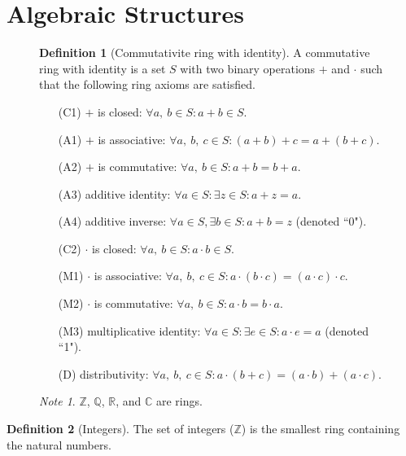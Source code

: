\documentclass{article}
\newcommand*{\Z}{\mathbb{Z}}
\newcommand*{\Q}{\mathbb{Q}}
\newcommand*{\R}{\mathbb{R}}
\newcommand*{\C}{\mathbb{C}}
\theoremstyle{plain}
\numberwithin{theorem}{subsection}
\theoremstyle{definition}
\newtheorem{definition}{Definition}[section]
\numberwithin{definition}{subsection}
\theoremstyle{remark}
\newtheorem{note}{Note}[section]
\numberwithin{note}{subsection}
\begin{document}
\section{Algebraic Structures}
\begin{figure}[H]
    \begin{mdframed}[style=exampledefault,frametitle={Ring Axioms}]
        \begin{definition}[Commutativite ring with identity]
            A commutative ring with identity is a set $S$ with two binary operations $+$ and $\cdot$ such that the following ring axioms are satisfied.
        \end{definition}
        \begin{enumerate}[leftmargin=3.5em, itemsep=0.2em, topsep=0.35em]
            \item[(C1)] $+$ is closed: $\forall a,\:b \in S: a+b \in S$.
            \item[(A1)] $+$ is associative: $\forall a,\:b,\:c \in S: (a+b)+c = a+(b+c)$.
            \item[(A2)] $+$ is commutative: $\forall a,\:b \in S: a+b=b+a$.
            \item[(A3)] additive identity: $\forall a\in S:\exists z \in S:a+z=a$.
            \item[(A4)] additive inverse: $\forall a \in S, \exists b\in S: a+b = z$ (denoted ``0").
            \item[(C2)] $\cdot$ is closed: $\forall a,\:b \in S: a \cdot b \in S$.
            \item[(M1)] $\cdot$ is associative: $\forall a,\:b,\:c \in S:a \cdot (b \cdot c) = (a \cdot c) \cdot c$.
            \item[(M2)] $\cdot$ is commutative: $\forall a,\:b \in S:a \cdot b = b \cdot a$.
            \item[(M3)] multiplicative identity: $\forall a \in S:\exists e \in S:a \cdot e = a$ (denoted ``1").
            \item[(D)] distributivity: $\forall a,\:b,\:c \in S: a \cdot (b + c) = (a \cdot b) + (a \cdot c)$.
        \end{enumerate}
    \end{mdframed}
    \begin{note}
        $\Z$, $\Q$, $\R$, and $\C$ are rings.
    \end{note}
\end{figure}
%
\begin{definition}[Integers]
    The set of integers ($\Z$) is the smallest ring containing the natural numbers.
\end{definition}
\end{document}
